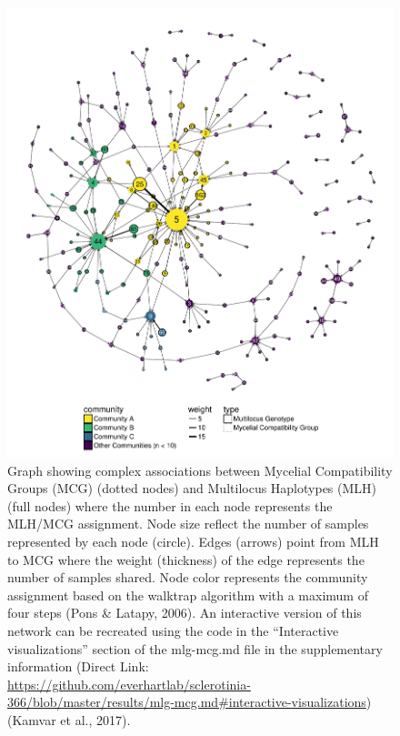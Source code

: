\begin{figure}
\centering
\includegraphics[width=1.00000\textwidth]{../../results/figures/publication/full-graph.pdf}
\caption{Graph showing complex associations between Mycelial
Compatibility Groups (MCG) (dotted nodes) and Multilocus Haplotypes
(MLH) (full nodes) where the number in each node represents the MLH/MCG
assignment. Node size reflect the number of samples represented by each
node (circle). Edges (arrows) point from MLH to MCG where the weight
(thickness) of the edge represents the number of samples shared. Node
color represents the community assignment based on the walktrap
algorithm with a maximum of four steps (Pons \& Latapy, 2006). An
interactive version of this network can be recreated using the code in
the ``Interactive visualizations'' section of the mlg-mcg.md file in the
supplementary information (Direct Link:
\url{https://github.com/everhartlab/sclerotinia-366/blob/master/results/mlg-mcg.md\#interactive-visualizations})
(Kamvar et al., 2017).}\label{fullgraph}
\end{figure}

